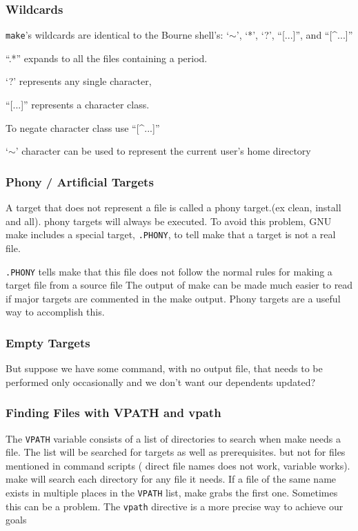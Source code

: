 \subsubsection{Wildcards}%
\label{ssub:make_wildcards}

\texttt{make}’s wildcards are identical to the Bourne shell’s: `$\sim$', `*', `?', ``[...]'', and ``[\^{}...]''

``.*'' expands to all the files containing a period.

`?' represents any single character,

``[...]'' represents a character class.

To negate character class use ``[\^{}...]''

`$\sim$' character can be used to represent the current user’s home directory


\subsubsection{Phony / Artificial Targets }%
\label{ssub:make_phony}

A target that does not represent a file is called a phony target.(ex clean, install and all).
phony targets will always be executed.
To avoid this problem, GNU make includes a special target, \texttt{.PHONY}, to tell make that a target is not a real file.


\texttt{.PHONY} tells make that this file does not follow the normal rules for making a target file from a source file
The output of make can be made much easier to read if major targets are commented in the make output. Phony targets are a useful way to accomplish this.


\subsubsection{Empty Targets }%
\label{ssub:make_empty}
 But suppose we have some command, with no output file, that needs to be performed only occasionally and we don’t want our dependents updated?

\subsubsection{ Finding Files with VPATH and vpath }%
\label{ssub:make_vpth}

The \texttt{VPATH} variable consists of a list of directories to search when make needs a file.
The list will be searched for targets as well as prerequisites.
but not for files mentioned in command scripts ( direct file names does not work, variable works).
make will search each directory for any file it needs. If a file of the same name exists in multiple places in the \texttt{VPATH} list, make grabs the first one. Sometimes this can be a problem.
The \texttt{vpath} directive is a more precise way to achieve our goals


